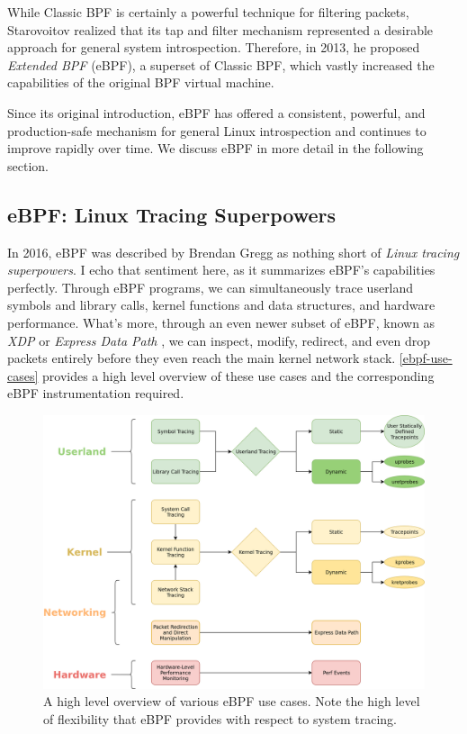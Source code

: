 \documentclass[
  12pt]{findlay}
\begin{document}
While Classic BPF is certainly a powerful technique for filtering
packets, Starovoitov \autocite{starovoitov13,starovoitov14} realized
that its tap and filter mechanism represented a desirable approach for
general system introspection. Therefore, in 2013, he proposed
\emph{Extended BPF} (eBPF), a superset of Classic BPF, which vastly
increased the capabilities of the original BPF virtual machine.

Since its original introduction, eBPF has offered a consistent,
powerful, and production-safe mechanism for general Linux introspection
and continues to improve rapidly over time. We discuss eBPF in more
detail in the following section.

\hypertarget{ebpf-linux-tracing-superpowers}{%
\subsection{eBPF: Linux Tracing
Superpowers}\label{ebpf-linux-tracing-superpowers}}

\label{ebpf-superpowers}

In 2016, eBPF was described by Brendan Gregg \autocite{gregg16} as
nothing short of \emph{Linux tracing superpowers}. I echo that sentiment
here, as it summarizes eBPF's capabilities perfectly. Through eBPF
programs, we can simultaneously trace userland symbols and library
calls, kernel functions and data structures, and hardware performance.
What's more, through an even newer subset of eBPF, known as \emph{XDP}
or \emph{Express Data Path} \autocite{xdp}, we can inspect, modify,
redirect, and even drop packets entirely before they even reach the main
kernel network stack. \autoref{ebpf-use-cases} provides a high level
overview of these use cases and the corresponding eBPF instrumentation
required.

\begin{figure}
\includegraphics{../figures/eBPF-use-cases.png}
\caption[A high level overview of various eBPF use cases]{
A high level overview of various eBPF use cases.
Note the high level of flexibility that eBPF provides
with respect to system tracing.}
\label{ebpf-use-cases}
\end{figure}
\end{document}
